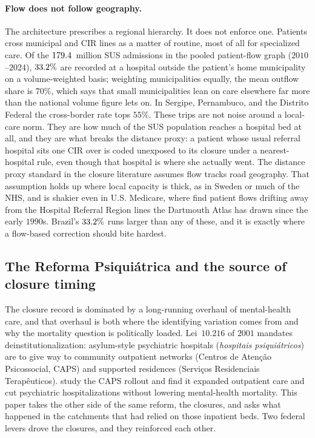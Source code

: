 \paragraph{Flow does not follow geography.} The architecture prescribes a
regional hierarchy. It does not enforce one. Patients cross municipal and
CIR lines as a matter of routine, most of all for specialized care. Of
the $179.4$~million SUS admissions in the pooled patient-flow
graph ($2010$--$2024$), $33.2\%$ are recorded at a hospital
outside the patient's home municipality on a volume-weighted basis;
weighting municipalities equally, the mean outflow share is $70\%$, which
says that small municipalities lean on care elsewhere far more than the
national volume figure lets on. In Sergipe, Pernambuco, and the Distrito
Federal the cross-border rate tops $55\%$. These trips are not noise
around a local-care norm. They are how much of the SUS population reaches
a hospital bed at all, and they are what breaks the distance proxy: a
patient whose usual referral hospital sits one CIR over is coded
unexposed to its closure under a nearest-hospital rule, even though that
hospital is where she actually went. The distance proxy standard in the
closure literature \citep{avdic2016, carroll2019, joynt2015,
lindrooth2018} assumes flow tracks road geography. That assumption holds
up where local capacity is thick, as in Sweden or much of the NHS, and is
shakier even in U.S. Medicare, where \citet{wang2020hrr} find patient
flows drifting away from the Hospital Referral Region lines the Dartmouth
Atlas has drawn since the early $1990$s. Brazil's $33.2\%$
runs larger than any of these, and it is exactly where a flow-based
correction should bite hardest.

\subsection{The Reforma Psiquiátrica and the source of closure timing}
\label{sec:setting-psiquiatrica}

The closure record is dominated by a long-running overhaul of
mental-health care, and that overhaul is both where the identifying
variation comes from and why the mortality question is politically
loaded. Lei~$10.216$ of $2001$ mandates deinstitutionalization:
asylum-style psychiatric hospitals (\emph{hospitais psiquiátricos}) are
to give way to community outpatient networks (Centros de Atenção
Psicossocial, CAPS) and supported residences (Serviços Residenciais
Terapêuticos). \citet{diasFontes2024} study the CAPS rollout and find it
expanded outpatient care and cut psychiatric hospitalizations without
lowering mental-health mortality. This paper takes the other side of the
same reform, the closures, and asks what happened in the catchments that
had relied on those inpatient beds. Two federal levers drove the
closures, and they reinforced each other.


